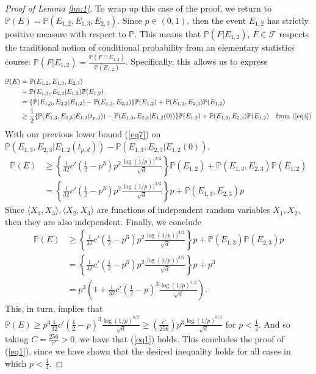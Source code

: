 \documentclass{article}
\begin{document}
\begin{proof}[Proof of Lemma \ref{lm:1}]
To wrap up this case of the proof, we return to $\mathbb{P}(E) = \mathbb{P}(E_{1,2}, E_{1,3}, E_{2,3}).$ Since $p \in (0, 1)$, then the event $E_{1,2}$ has strictly positive measure with respect to $\mathbb{P}$. This means that $\mathbb{P}( F | E_{1,2})$, $F \in \mathcal{F}$ respects the traditional notion of conditional probability from an elementary statistics course: $\mathbb{P}( F | E_{1,2}) = \frac{\mathbb{P}(F \cap E_{1,2}) }{\mathbb{P}(E_{1,2})}$. Specifically, this allows us to express
\begin{align*}
    \mathbb{P}(E) &= \mathbb{P}(E_{1,2}, E_{1,3}, E_{2,3})\\
               &= \mathbb{P}(E_{1,3}, E_{2,3} | E_{1,2}) \mathbb{P}(E_{1,2})\\
               &= \{ \mathbb{P}(E_{1,3}, E_{2,3} | E_{1,2}) - \mathbb{P}(E_{1,3}, E_{2,3}) \}\mathbb{P}(E_{1,2}) + \mathbb{P}(E_{1,3}, E_{2,3})\mathbb{P}(E_{1,2})\\
               &\geq \frac{1}{2}\{ \mathbb{P}(E_{1,3}, E_{2,3} | E_{1,2}(t_{p,d})) - \mathbb{P}(E_{1,3},E_{2,3}| E_{1,2}(0)) \}\mathbb{P}(E_{1,2}) + \mathbb{P}(E_{1,3}, E_{2,3})\mathbb{P}(E_{1,2}) &\text{from (\ref{eq4})}
\end{align*}
With our previous lower bound (\ref{eq7}) on $\mathbb{P}(E_{1,3}, E_{2,3} | E_{1,2}(t_{p,d})) - \mathbb{P}(E_{1,3},E_{2,3}| E_{1,2}(0))$,
\begin{align*}
    \mathbb{P}(E) &\geq  \left\{ \frac{1}{32} c'\left( \frac{1}{2} - p^3 \right)p^2 \frac{\log(1/p))^{3/2}}{\sqrt{d}} \right\}\mathbb{P}(E_{1,2}) + \mathbb{P}(E_{1,3}, E_{2,3})\mathbb{P}(E_{1,2})\\
    &= \left\{ \frac{1}{32} c'\left( \frac{1}{2} - p^3 \right)p^2 \frac{\log(1/p))^{3/2}}{\sqrt{d}} \right\}p + \mathbb{P}(E_{1,3}, E_{2,3})p
\end{align*}
Since $\langle X_1, X_3 \rangle, \langle X_2, X_3 \rangle$ are functions of independent random variables $X_1, X_2$, then they are also independent. Finally, we conclude
\begin{align}
\mathbb{P}(E) &\geq \left\{ \frac{1}{32} c'\left( \frac{1}{2} - p^3 \right)p^2 \frac{\log(1/p))^{3/2}}{\sqrt{d}} \right\}p + \mathbb{P}(E_{1,3})\mathbb{P}(E_{2,3})p \nonumber\\
&= \left\{ \frac{1}{32} c'\left( \frac{1}{2} - p^3 \right)p^2 \frac{\log(1/p))^{3/2}}{\sqrt{d}} \right\}p + p^3 \nonumber\\
&= p^3 \left(1 + \frac{1}{32}c' \left(\frac{1}{2} - p \right)^3 \frac{\log(1/p)^{3/2}}{\sqrt{d}} \right)\label{eq8}.
\end{align}
This, in turn, implies that $\mathbb{P}(E) \geq p^3\frac{1}{32}c' \left(\frac{1}{2} - p \right)^3 \frac{\log(1/p)^{3/2}}{\sqrt{d}} \geq \left(\frac{c'}{256} \right)p^3 \frac{\log(1/p)^{3/2}}{\sqrt{d}}$ for $p < \frac{1}{4}$. And so taking $C = \frac{256}{c'} > 0$, we have that (\ref{eq1}) holds. This concludes the proof of (\ref{eq1}), since we have shown that the desired inequality holds for all cases in which $p < \frac{1}{4}$.


\end{proof}
\end{document}
